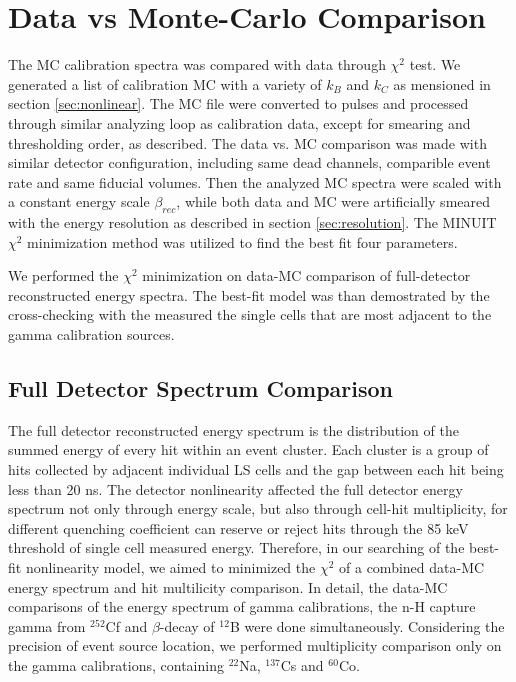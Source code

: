 \section{Data vs Monte-Carlo Comparison}
\label{sec:dataMC}
The MC calibration spectra was compared with data through $\chi^2$ test. 
We generated a list of calibration MC with a variety of $k_B$ and $k_C$ as mensioned in section \ref{sec:nonlinear}. 
The MC file were converted to pulses and processed through similar analyzing loop as calibration data, except for smearing and thresholding order, as described.
The data vs. MC comparison was made with similar detector configuration, including same dead channels, comparible event rate and same fiducial volumes.
Then the analyzed MC spectra were scaled with a constant energy scale $\beta_{rec}$, while both data and MC were artificially smeared with the energy resolution as described in section \ref{sec:resolution}.
The MINUIT $\chi^2$ minimization method was utilized to find the best fit four parameters. 

We performed the $\chi^2$ minimization on data-MC comparison of full-detector reconstructed energy spectra.
The best-fit model was than demostrated by the cross-checking with the measured the single cells that are most adjacent to the gamma calibration sources.

\subsection{Full Detector Spectrum Comparison}
\label{sec:fulldet}
The full detector reconstructed energy spectrum is the distribution of the summed energy of every hit within an event cluster. 
Each cluster is a group of hits collected by adjacent individual LS cells and the gap between each hit being less than 20 ns.
The detector nonlinearity affected the full detector energy spectrum not only through energy scale, but also through cell-hit multiplicity, for different quenching coefficient can reserve or reject hits through the 85 keV threshold of single cell measured energy.
Therefore, in our searching of the best-fit nonlinearity model, we aimed to minimized the $\chi^2$ of a combined data-MC energy spectrum and hit multilicity comparison. 
In detail, the data-MC comparisons of the energy spectrum of gamma calibrations, the n-H capture gamma from $^{252}$Cf and $\beta$-decay of $^{12}$B were done simultaneously.
Considering the precision of event source location, we performed multiplicity comparison only on the gamma calibrations, containing $^{22}$Na, $^{137}$Cs and $^{60}$Co.

